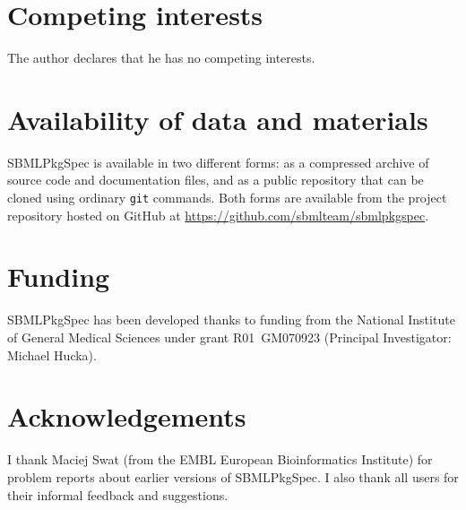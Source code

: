 \documentclass{bmcart}
\newcommand{\sbmlpkg}{SBMLPkgSpec}
\newcommand{\githuburl}{https://github.com/sbmlteam/sbmlpkgspec}
\begin{document}

\begin{backmatter}

\section*{Competing interests}

The author declares that he has no competing interests.


\section*{Availability of data and materials}

\sbmlpkg{} is available in two different forms: as a compressed archive of source code and documentation files, and as a public repository that can be cloned using ordinary \texttt{git} commands.  Both forms are available from the project repository hosted on GitHub at \url{\githuburl}.

\section*{Funding}

\sbmlpkg{} has been developed thanks to funding from the National Institute of General Medical Sciences under grant R01~GM070923 (Principal Investigator: Michael Hucka).

\section*{Acknowledgements}

I thank Maciej Swat (from the EMBL European Bioinformatics Institute) for problem reports about earlier versions of \sbmlpkg.  I also thank all users for their informal feedback and suggestions.  




\end{backmatter}
\end{document}
